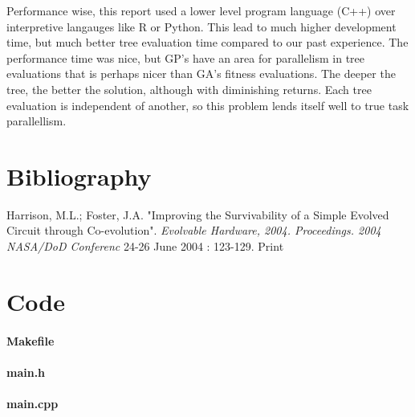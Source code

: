 \documentclass[12pt]{article}
\begin{document}
Performance wise, this report used a lower level program language (C++) over interpretive langauges like R or Python. This lead to much higher development time, but much better tree evaluation time compared to our past experience. The performance time was nice, but GP's have an area for parallelism in tree evaluations that is perhaps nicer than GA's fitness evaluations. The deeper the tree, the better the solution, although with diminishing returns. Each tree evaluation is independent of another, so this problem lends itself well to true task parallellism.

\part{Bibliography}

\begin{thebibliography}{99}
 Harrison, M.L.; Foster, J.A. "Improving the Survivability of a Simple Evolved Circuit through Co-evolution". { \em  Evolvable Hardware, 2004. Proceedings. 2004 NASA/DoD Conferenc } 24-26 June 2004 : 123-129. Print

\end{thebibliography}


\pagebreak


%



\part{Code}
\footnotesize
\subsection{Makefile}


\subsection{main.h}


\subsection{main.cpp}

\end{document}
